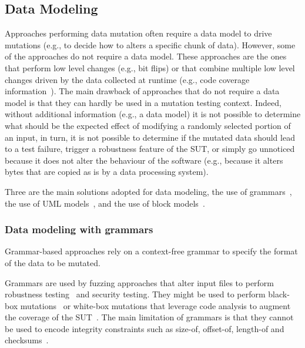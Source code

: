 
\subsection{Data Modeling}
\label{sec:dataModeling}

Approaches performing data mutation often require a data model to drive mutations (e.g., to decide how to alters a specific chunk of data). 
However, some of the approaches do not require a data model. 
These approaches are the ones that perform low level changes (e.g., bit flips) or that combine multiple low level changes driven by the data collected at runtime (e.g., code coverage information~\cite{}).
The main drawback of approaches that do not require a data model is that they can hardly be used in a mutation testing context.
Indeed, without additional information (e.g., a data model) it is not possible to determine what should be the expected effect of modifying a randomly selected portion of an input, in turn, it is not possible to determine if the mutated data should lead to a test failure, trigger a robustness feature of the SUT, or simply go unnoticed because it does not alter the behaviour of the software (e.g., because it alters bytes that are copied as is by a data processing system).

Three are the main solutions adopted for data modeling, the use of grammars~\cite{ghosh1998testing,Godefroid:GrammarBasedFuzzying:2008,godefroid2012sage,bounimova2013billions}, the use of UML models~\cite{di2015evolutionary}, and the use of block models~\cite{pham2016model,PeachFuzzer}.

\subsubsection{Data modeling with grammars}

Grammar-based approaches rely on a context-free grammar to specify the format of the data to be mutated. 

Grammars are used by fuzzing approaches that alter input files to perform robustness testing~\cite{ghosh1998testing} and security testing. They might be used to perform black-box mutations~\cite{ghosh1998testing} or white-box mutations that leverage code analysis to augment the coverage of the SUT~\cite{Godefroid:GrammarBasedFuzzying:2008}.
The main limitation of grammars is that they cannot be used to encode integrity constraints such as size-of, offset-of, length-of and checksums~\cite{pham2016model}. 


